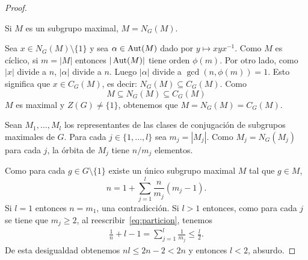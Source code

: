 \begin{proof}
	\begin{claim}
	  Si $M$ es un subgrupo maximal, $M=N_G(M)$.   
	\end{claim}

	Sea $x\in N_G(M)\setminus\{1\}$ y sea $\alpha\in\operatorname{Aut}(M)$ dado por
	$y\mapsto xyx^{-1}$. Como $M$ es cíclico, si $m=|M|$ entonces
	$|\operatorname{Aut}(M)|$ tiene orden $\phi(m)$. Por otro lado, como $|x|$ divide a
	$n$, $|\alpha|$ divide a $n$. Luego $|\alpha|$ divide a
	$\gcd(n,\phi(m))=1$. Esto significa que $x\in C_G(M)$, es decir:
	$N_G(M)\subseteq C_G(M)$. Como
	\[
	M\subseteq N_G(M)\subseteq C_G(M)
	\]
	$M$ es maximal y $Z(G)\ne\{1\}$, obtenemos que $M=N_G(M)=C_G(M)$. 

	\medskip
	Sean $M_1,\dots,M_l$ los representantes de las clases de conjugación de
	subgrupos maximales de $G$. Para cada $j\in\{1,\dots,l\}$ sea
	$m_j=|M_j|$.  Como $M_{j}=N_G(M_j)$ para cada $j$, la órbita de $M_j$
	tiene $n/m_j$ elementos. 
	
	Como para cada $g\in G\setminus\{1\}$ existe un único subgrupo maximal
	$M$ tal que $g\in M$, 
	\begin{equation}
	  \label{eq:particion}
	  n=1+\sum_{j=1}^l \frac{n}{m_j}(m_j-1).
	\end{equation}
	Si $l=1$ entonces $n=m_1$, una contradicción. Si $l>1$ entonces, como
	para cada $j$ se tiene que $m_j\geq2$, al reescribir~\eqref{eq:particion}, tenemos
	\begin{align*}
	  \frac{1}{n}+l-1=\sum_{j=1}^l\frac{1}{m_j}\leq\frac{l}{2}.
	\end{align*}
	De esta desigualdad obtenemos $nl\leq 2n-2<2n$ y entonces $l<2$, absurdo. 
%
%
%
%
%
%
\end{proof}

